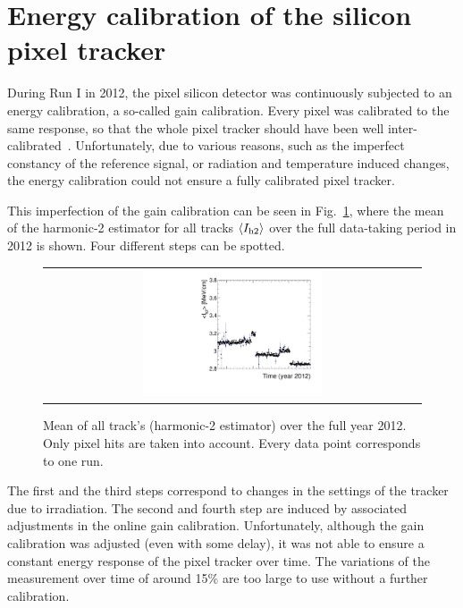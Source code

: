 \FloatBarrier
\section{Energy calibration of the silicon pixel tracker}
\label{sec:EnergyCalibration}
During Run I in 2012, the pixel silicon detector was continuously subjected to an energy calibration, a so-called gain calibration.
Every pixel was calibrated to the same response, so that the whole pixel tracker should have been well inter-calibrated~\cite{bib:Danek}.
Unfortunately, due to various reasons, such as the imperfect constancy of the reference signal, or radiation and temperature induced changes, the energy calibration could not ensure a fully calibrated pixel tracker.

This imperfection of the gain calibration can be seen in Fig.~\ref{fig:StabilityPlot_beforeCalibration}, where the mean of the harmonic-2 estimator for all tracks $\langle I_{\text{h2}} \rangle$ over the full data-taking period in 2012 is shown.
Four different steps can be spotted.
\begin{figure}[!b]
  \centering 
  \begin{tabular}{c}
  \includegraphics[width=0.49\textwidth]{figures/analysis/PixelCalibration/StabilityPlot_Pixel_beforeCalibration_withoutStepFits_NEW.pdf}
  \end{tabular}
  \caption{Mean of all track's \dedx (harmonic-2 estimator) over the full year 2012. Only pixel hits are taken into account. Every data point corresponds to one run.} 
  \label{fig:StabilityPlot_beforeCalibration}
\end{figure}
The first and the third steps correspond to changes in the settings of the tracker due to irradiation.
The second and fourth step are induced by associated adjustments in the online gain calibration.
Unfortunately, although the gain calibration was adjusted (even with some delay), it was not able to ensure a constant energy response of the pixel tracker over time. 
The variations of the \dedx measurement over time of around 15\% are too large to use \dedx without a further calibration. 

